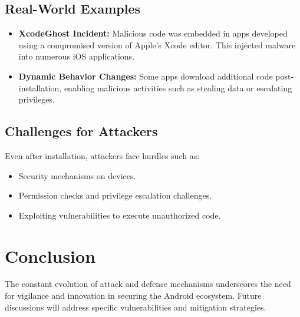 \documentclass{article}
\begin{document}
\subsection{Real-World Examples}
\begin{itemize}
    \item \textbf{XcodeGhost Incident:} Malicious code was embedded in apps developed using a compromised version of Apple's Xcode editor. This injected malware into numerous iOS applications.
    \item \textbf{Dynamic Behavior Changes:} Some apps download additional code post-installation, enabling malicious activities such as stealing data or escalating privileges.
\end{itemize}

\subsection{Challenges for Attackers}
Even after installation, attackers face hurdles such as:
\begin{itemize}
    \item Security mechanisms on devices.
    \item Permission checks and privilege escalation challenges.
    \item Exploiting vulnerabilities to execute unauthorized code.
\end{itemize}

\section{Conclusion}
The constant evolution of attack and defense mechanisms underscores the need for vigilance and innovation in securing the Android ecosystem. Future discussions will address specific vulnerabilities and mitigation strategies.
\end{document}
